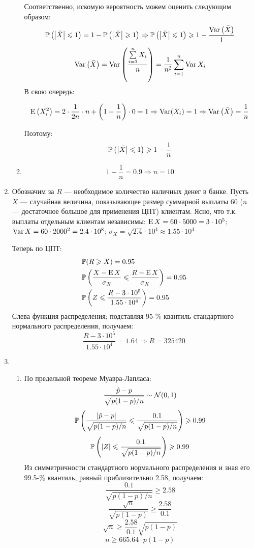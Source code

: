 \begin{enumerate}
\begin{enumerate}
Соответственно, искомую вероятность можем оценить следующим образом:
\[
\P\left(\left|\bar{X}\right| \leqslant 1\right) = 1 -\P\left(\left|\bar{X}\right| \geqslant 1\right) \Rightarrow \P\left(\left|\bar{X}\right| \leqslant 1\right) \geqslant 1 - \frac{\Var\left(\bar{X}\right)}{1}
\]
\[
\Var\left(\bar{X}\right) = \Var\left(\frac{\sum\limits_{i=1}^{n} X_i}{n}\right) = \frac{1}{n^2}\sum \limits_{i=1}^{n} \Var{X_i}
\]
В свою очередь:

\[
\E\left(X_i^2\right) = 2\cdot\frac{1}{2n}\cdot n + \left(1-\frac{1}{n}\right)\cdot0 = 1 \Rightarrow \Var(X_i) = 1 \Rightarrow \Var\left(\bar{X}\right) = \frac{1}{n}
\]

Поэтому:
\[
\P\left(\left|\bar{X}\right| \leqslant 1 \right) \geqslant 1 - \frac{1}{n}
\]

\item
\[
1 - \frac{1}{n} = 0.9  \Rightarrow n = 10
\]

\end{enumerate}

\item

Обозначим за $R$ — необходимое количество наличных денег в банке. Пусть $X$ — случайная величина, показывающее размер суммарной выплаты $60$ ($n$ — достаточное большое для применения ЦПТ) клиентам. Ясно, что т.к. выплаты отдельным клиентам независимы: \( \E X = 60 \cdot 5000 = 3\cdot 10^5 \); \( \Var X = 60 \cdot 2000^2 = 2.4 \cdot 10^8 \); \( \sigma_X = \sqrt{2.4} \cdot 10^4 \approx 1.55 \cdot 10^4\)

Теперь по ЦПТ:
\begin{align*}
&\P(R \geqslant X) = 0.95 \\
&\P \left(\frac{X - \E X}{\sigma_X} \leqslant \frac{R - \E X}{\sigma_X} \right) = 0.95 \\
&\P \left( Z \leqslant \frac{R - 3 \cdot 10^5}{1.55 \cdot 10^4} \right) = 0.95
\end{align*}
Слева функция распределения; подставляя 95-\% квантиль стандартного нормального распределения, получаем:
\[
\frac{R - 3 \cdot 10^5}{1.55 \cdot 10^4} = 1.64 \Rightarrow R = 325420
\]


\item

\begin{enumerate}
\item По предельной теореме Муавра-Лапласа:
\[ \frac{\hat{p} - p}{\sqrt{p(1-p)/n}} \sim \cN (0,1) \]
\[ \P \left( \frac{|\hat{p} - p|}{\sqrt{p(1-p)/n}} \leqslant \frac{0.1}{\sqrt{p(1-p)/n}} \right) \geqslant 0.99 \]
\[ \P \left( |Z| \leqslant \frac{0.1}{\sqrt{p(1-p)/n}} \right) \geqslant 0.99 \]
Из симметричности стандартного нормального распределения и зная его 99.5-\% квантиль, равный приблизительно 2.58, получаем:
\[ \frac{0.1}{\sqrt{p(1-p)/n}} \geqslant 2.58 \]
\[ \frac{\sqrt{n}}{\sqrt{p(1-p)}} \geqslant \frac{2.58}{0.1} \]
\[ \sqrt{n} \geqslant \frac{2.58}{0.1} \sqrt{p(1-p)} \]
\[ n \geqslant 665.64 \cdot p(1-p) \]


\end{enumerate}
\end{enumerate}
